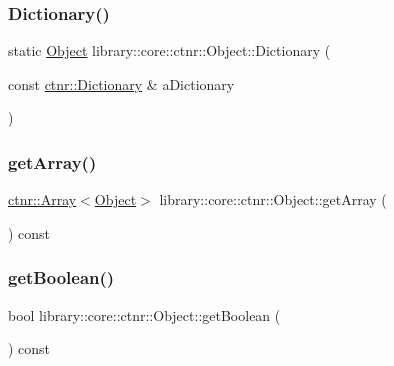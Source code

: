 \subsubsection{\texorpdfstring{Dictionary()}{Dictionary()}}
{\footnotesize\ttfamily static \hyperlink{classlibrary_1_1core_1_1ctnr_1_1_object}{Object} library\+::core\+::ctnr\+::\+Object\+::\+Dictionary (\begin{DoxyParamCaption}\item[{const \hyperlink{classlibrary_1_1core_1_1ctnr_1_1_dictionary}{ctnr\+::\+Dictionary} \&}]{a\+Dictionary }\end{DoxyParamCaption})\hspace{0.3cm}{\ttfamily [static]}}

\mbox{\label{classlibrary_1_1core_1_1ctnr_1_1_object_a37d488c95c8336b17400fd26874603b6}} 
\subsubsection{\texorpdfstring{get\+Array()}{getArray()}}
{\footnotesize\ttfamily \hyperlink{classlibrary_1_1core_1_1ctnr_1_1_array}{ctnr\+::\+Array}$<$\hyperlink{classlibrary_1_1core_1_1ctnr_1_1_object}{Object}$>$ library\+::core\+::ctnr\+::\+Object\+::get\+Array (\begin{DoxyParamCaption}{ }\end{DoxyParamCaption}) const}

\mbox{\label{classlibrary_1_1core_1_1ctnr_1_1_object_a57a984b26f914c33155c79f88e01b934}} 
\subsubsection{\texorpdfstring{get\+Boolean()}{getBoolean()}}
{\footnotesize\ttfamily bool library\+::core\+::ctnr\+::\+Object\+::get\+Boolean (\begin{DoxyParamCaption}{ }\end{DoxyParamCaption}) const}

